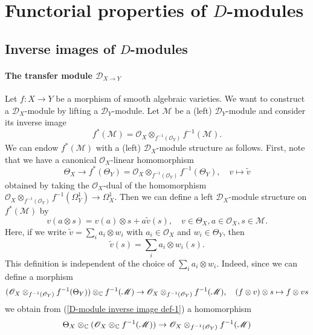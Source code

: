 \section{Functorial properties of \texorpdfstring{$D$}{D}-modules}
\subsection{Inverse images of \texorpdfstring{$D$}{D}-modules}
\paragraph{The transfer module \texorpdfstring{$\mathscr{D}_{X\to Y}$}{D}}
Let $f:X\to Y$ be a morphism of smooth algebraic varieties. We want to construct a $\mathscr{D}_X$-module by lifting a $\mathscr{D}_Y$-module. Let $\mathscr{M}$ be a (left) $\mathscr{D}_Y$-module and consider its inverse image
\[f^*(\mathscr{M})=\mathscr{O}_X\otimes_{f^{-1}(\mathscr{O}_Y)}f^{-1}(\mathscr{M}).\]
We can endow $f^*(\mathscr{M})$ with a (left) $\mathscr{D}_X$-module structure as follows. First, note that we have a canonical $\mathscr{O}_X$-linear homomorphism
\begin{equation}\label{D-module inverse image def-1}
\Theta_X\to f^*(\Theta_Y)=\mathscr{O}_X\otimes_{f^{-1}(\mathscr{O}_Y)}f^{-1}(\Theta_Y),\quad v\mapsto\tilde{v}
\end{equation}
obtained by taking the $\mathscr{O}_X$-dual of the homomorphism $\mathscr{O}_X\otimes_{f^{-1}(\mathscr{O}_Y)}f^{-1}(\Omega_Y^1)\to\Omega_X^1$. Then we can define a left $\mathscr{D}_X$-module structure on $f^*(\mathscr{M})$ by
\begin{equation}\label{D-module inverse image def-2}
v(a\otimes s)=v(a)\otimes s+a\tilde{v}(s),\quad v\in\Theta_X,a\in\mathscr{O}_X,s\in\mathscr{M}.
\end{equation}
Here, if we write $\tilde{v}=\sum_ia_i\otimes w_i$ with $a_i\in\mathscr{O}_X$ and $w_i\in\Theta_Y$, then
\begin{equation}\label{D-module inverse image def-3}
\tilde{v}(s)=\sum_ia_i\otimes w_i(s).
\end{equation}
This definition is independent of the choice of $\sum_ia_i\otimes w_i$. Indeed, since we can define a morphism
\[(\mathscr{O}_X\otimes_{f^{-1}(\mathscr{O}_Y)}f^{-1}(\Theta_Y))\otimes_{\mathbb{C}}f^{-1}(\mathscr{M})\to \mathscr{O}_X\otimes_{f^{-1}(\mathscr{O}_Y)}f^{-1}(\mathscr{M}),\quad (f\otimes v)\otimes s\mapsto f\otimes vs\]
we obtain from (\ref{D-module inverse image def-1}) a homomorphism
\[\Theta_X\otimes_{\mathbb{C}}(\mathscr{O}_X\otimes_{\mathbb{C}}f^{-1}(\mathscr{M}))\to \mathscr{O}_X\otimes_{f^{-1}(\mathscr{O}_Y)}f^{-1}(\mathscr{M})\]
